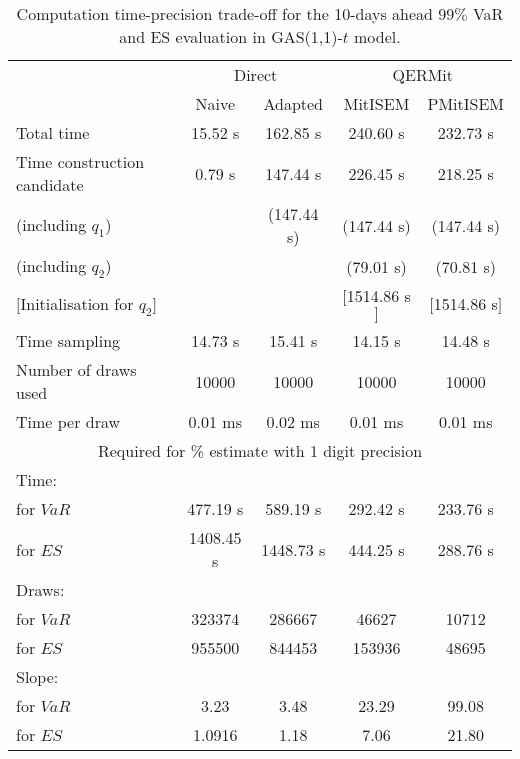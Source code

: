 { \renewcommand{\arraystretch}{1.3} 
\begin{table}[h] 
\centering 
\caption{Computation time-precision trade-off for the 10-days ahead  $99\%$ VaR and ES evaluation in GAS(1,1)-$t$ model.} 
\label{tab:time_precision_t_gas} 
\begin{tabular}{lcccc}  
  & \multicolumn{2}{c}{Direct} & \multicolumn{2}{c}{QERMit}  \\ \cline{2-5} 
  & Naive & Adapted & MitISEM & PMitISEM  \\ \hline 
Total time & 15.52 s & 162.85 s & 240.60 s & 232.73 s \\ 
Time construction candidate & 0.79 s & 147.44 s & 226.45 s & 218.25 s \\ 
 (including $q_{1}$) &   &  (147.44 s) & (147.44 s) & (147.44 s) \\ 
 (including $q_{2}$) &   &  & (79.01 s) & (70.81 s) \\ 
$[$Initialisation for $q_{2}$$]$&   &   & $[$1514.86 s$]$ & $[$1514.86 s$]$ \\ 
Time sampling & 14.73 s & 15.41 s & 14.15 s & 14.48 s  \\  
Number of draws used & 10000 & 10000 & 10000 & 10000 \\ 
Time per draw & 0.01 ms & 0.02 ms & 0.01 ms & 0.01 ms \\ \hline 
\multicolumn{5}{c}{Required for \% estimate with 1 digit precision} \\ \hline 
Time: &  &  &   &  \\ 
\hspace{1cm} for $VaR$ & 477.19 s & 589.19 s & 292.42 s & 233.76 s \\ 
\hspace{1cm} for $ES$ & 1408.45 s & 1448.73 s & 444.25 s & 288.76 s \\ 
Draws: &  &  &   &  \\ 
\hspace{1cm} for $VaR$ & 323374 & 286667  &  46627  &  10712  \\ 
\hspace{1cm} for $ES$ & 955500 & 844453  & 153936   &  48695  \\ 
\hline 
Slope: &  &  &   &  \\ 
\hspace{1cm} for $VaR$ & 3.23 & 3.48  & 23.29  & 99.08  \\ 
\hspace{1cm} for $ES$ & 1.0916 & 1.18  & 7.06   & 21.80  \\  \hline 
\end{tabular} 
\end{table} 
} 

